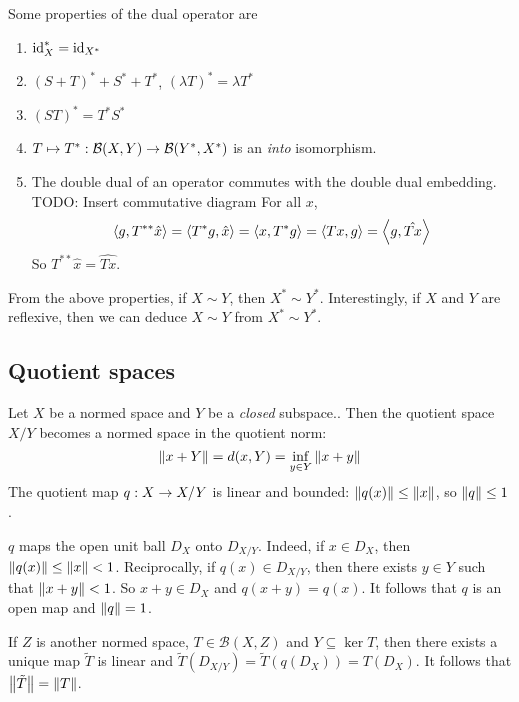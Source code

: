 \documentclass{article}
\begin{document}
Some properties of the dual operator are
\begin{enumerate}
  \item $\operatorname{id}_X^* = \operatorname{id}_{X^*}$
  \item $(S + T)^* + S^* + T^*$, $(\lambda T)^* = \lambda T^*$
  \item $(ST)^* = T^*S^*$
  \item $T \mapsto T^* : \mathcal B(X, Y) \rightarrow \mathcal B(Y^*, X^*)$ is an {\it into} isomorphism.
  \item The double dual of an operator commutes with the double dual embedding. \\
    TODO: Insert commutative diagram
    For all $x$,
    $$\left\langle g, T^{**}\hat x\right\rangle = \left\langle T^*g, \hat x\right\rangle = \left\langle x, T^*g\right\rangle = \left\langle Tx, g\right\rangle = \left\langle g, \hat{Tx}\right\rangle$$
    So $T^{**}\hat x = \widehat{Tx}$.
\end{enumerate}

\begin{rmk}
  From the above properties, if $X \sim Y$, then $X^* \sim Y^*$. Interestingly, if $X$ and $Y$ are reflexive, then we can deduce $X \sim Y$ from $X^* \sim Y^*$.
\end{rmk}

\subsection{Quotient spaces}

Let $X$ be a normed space and $Y$ be a {\it closed} subspace.. Then the quotient space $X / Y$ becomes a normed space in the quotient norm:
$$\left\lVert x + Y\right\rVert = d(x, Y) = \inf_{y \in Y} \left\lVert x + y\right\rVert$$
The quotient map $q : X \rightarrow X/Y$ is linear and bounded: $\left\lVert q(x)\right\rVert \le \left\lVert x\right\rVert$, so $\left\lVert q\right\rVert \le 1$.

$q$ maps the open unit ball $D_X$ onto $D_{X/Y}$. Indeed, if $x \in D_X$, then $\left\lVert q(x)\right\rVert \le \left\lVert x\right\rVert < 1$. Reciprocally, if $q(x) \in D_{X/Y}$, then there exists $y \in Y$ such that $\left\lVert x + y\right\rVert < 1$. So $x + y \in D_X$ and $q(x + y) = q(x)$. It follows that $q$ is an open map and $\left\lVert q\right\rVert = 1$.

If $Z$ is another normed space, $T \in \mathcal B(X, Z)$ and $Y \subseteq \ker T$, then there exists a unique map $\tilde T$ is linear and $\tilde T(D_{X/Y}) = \tilde T(q(D_X)) = T(D_X)$. It follows that $\left\lVert \tilde T\right\rVert = \left\lVert T\right\rVert$.
\end{document}
